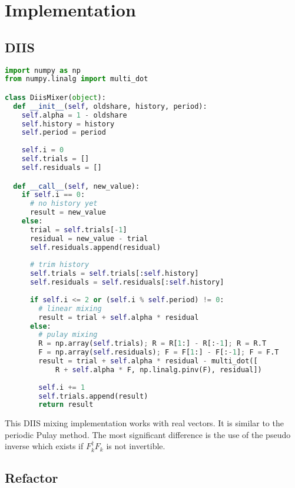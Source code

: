 \chapter{Implementation}
\label{ch:impl}

\section{DIIS}

\begin{lstlisting}[label=lst:diis, language=python, caption=DIIS implementation]
import numpy as np
from numpy.linalg import multi_dot

class DiisMixer(object):
  def __init__(self, oldshare, history, period):
    self.alpha = 1 - oldshare
    self.history = history
    self.period = period
    
    self.i = 0
    self.trials = []
    self.residuals = []

  def __call__(self, new_value):
    if self.i == 0:
      # no history yet
      result = new_value
    else:
      trial = self.trials[-1]
      residual = new_value - trial
      self.residuals.append(residual)
      
      # trim history
      self.trials = self.trials[:self.history]
      self.residuals = self.residuals[:self.history]
      
      if self.i <= 2 or (self.i % self.period) != 0:
        # linear mixing
        result = trial + self.alpha * residual
      else:
        # pulay mixing
        R = np.array(self.trials); R = R[1:] - R[:-1]; R = R.T
        F = np.array(self.residuals); F = F[1:] - F[:-1]; F = F.T
        result = trial + self.alpha * residual - multi_dot([
            R + self.alpha * F, np.linalg.pinv(F), residual])
        
        self.i += 1
        self.trials.append(result)
        return result
\end{lstlisting}

This DIIS mixing implementation works with real vectors. It is similar to the periodic Pulay method\cite{diis_periodic}. The most significant difference is the use of the pseudo inverse which exists if \(F_k^\dagger F_k\) is not invertible.

\section{Refactor}

